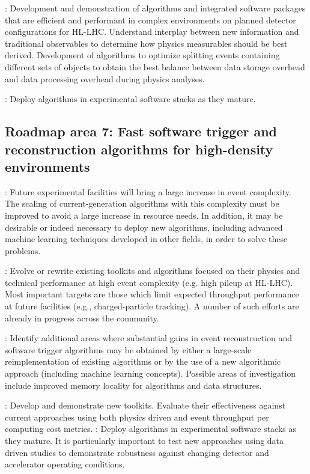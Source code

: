 \vskip 0.5cm
: Development and demonstration of algorithms and integrated software packages that are efficient and performant in complex environments on planned detector configurations for HL-LHC. Understand interplay between new information and traditional observables to determine how physics measurables should be best derived. Development of algorithms to optimize splitting events containing different sets of objects to obtain the best balance between data storage overhead and data processing overhead during physics analyses.

\vskip 0.5cm
: Deploy algorithms in experimental software stacks as they mature.

\subsection{Roadmap area 7: Fast software trigger and reconstruction algorithms for high-density environments}

: Future experimental facilities will bring a large increase in event complexity. The scaling of current-generation algorithms with this complexity must be improved to avoid a large increase in resource needs. In addition, it may be desirable or indeed necessary to deploy new algorithms, including advanced machine learning techniques developed in other fields, in order to solve these problems.

\vskip 0.5cm
: Evolve or rewrite existing toolkits and algorithms focused on their physics and technical performance at high event complexity (e.g. high pileup at HL-LHC). Most important targets are those which limit expected throughput performance at future facilities (e.g., charged-particle tracking). A number of such efforts are already in progress across the community.

\vskip 0.5cm
: Identify additional areas where substantial gains in event reconstruction and software trigger algorithms may be obtained by either a large-scale reimplementation of existing algorithms or by the use of a new algorithmic approach (including machine learning concepts). Possible areas of investigation include improved memory locality for algorithms and data structures.

\vskip 0.5cm
: Develop and demonstrate new toolkits. Evaluate their effectiveness against current approaches using both physics driven and event throughput per computing cost metrics. 
\vskip 0.5cm
: Deploy algorithms in experimental software stacks as they mature. It is particularly important to test new approaches using data driven studies to demonstrate robustness against changing detector and accelerator operating conditions.

